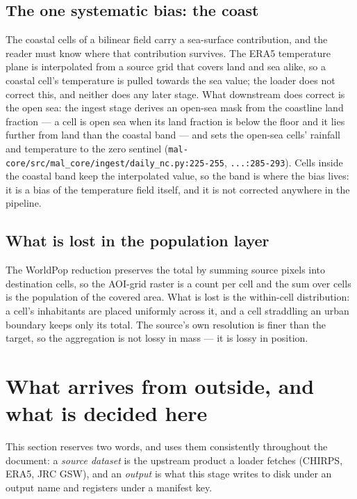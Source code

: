 \documentclass[11pt,a4paper]{article}
\newcommand{\code}[1]{\texttt{#1}}
\begin{document}
\subsection{The one systematic bias: the coast}

The coastal cells of a bilinear field carry a sea-surface contribution, and
the reader must know where that contribution survives. The ERA5 temperature
plane is interpolated from a source grid that covers land and sea alike, so
a coastal cell's temperature is pulled towards the sea value; the loader
does not correct this, and neither does any later stage. What downstream
does correct is the open sea: the ingest stage derives an open-sea mask from
the coastline land fraction --- a cell is open sea when its land fraction is
below the floor and it lies further from land than the coastal band --- and
sets the open-sea cells' rainfall and temperature to the zero sentinel
(\code{mal-core/src/mal\_core/ingest/daily\_nc.py:225-255},
\code{...:285-293}). Cells inside the coastal band keep the interpolated
value, so the band is where the bias lives: it is a bias of the temperature
field itself, and it is not corrected anywhere in the pipeline.

\subsection{What is lost in the population layer}

The WorldPop reduction preserves the total by summing source pixels into
destination cells, so the AOI-grid raster is a count per cell and the sum
over cells is the population of the covered area. What is lost is the
within-cell distribution: a cell's inhabitants are placed uniformly across it,
and a cell straddling an urban boundary keeps only its total. The source's
own resolution is finer than the target, so the aggregation is not lossy in
mass --- it is lossy in position.

\section{What arrives from outside, and what is decided here}

This section reserves two words, and uses them consistently throughout the
document: a \emph{source dataset} is the upstream product a loader fetches
(CHIRPS, ERA5, JRC GSW), and an \emph{output} is what this stage writes to
disk under an output name and registers under a manifest key.
\end{document}
